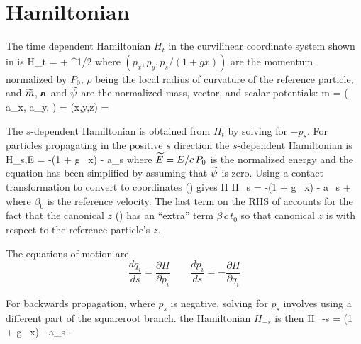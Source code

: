 \section{Hamiltonian}
\label{s:mag.hamiltonian}
The time dependent Hamiltonian $H_t$ in the curvilinear coordinate system shown
in  is
\Begineq
  H_t = \wt\psi + ^{1/2}
\Endeq
where $(p_x, p_y, p_s/(1+gx))$ are the momentum normalized by $P_0$,
$\rho$ being the local radius of curvature of the reference particle,
and $\widetilde m$, ${\bf a}$ and $\widetilde\psi$ are the normalized mass, vector, and scalar
potentials:
\Begineq
  \wt m =  \qquad
  \left( a_x, a_y,  \right) =  \qquad 
  \wt\psi(x,y,z) = 
\Endeq

The $s$-dependent Hamiltonian is obtained from $H_t$ by solving for
$-p_s$. For particles propagating in the positive $s$ direction the
$s$-dependent Hamiltonian is
\Begineq
  H_{s,E} = -(1 + g \, x)  - a_s
  \label{hse1gx1}
\Endeq
where $\widetilde E = E/c\, P_0$ is the normalized energy and the equation 
has been simplified by assuming that $\widetilde\psi$ is zero. Using a contact
transformation to convert to \bmad coordinates () gives
\Begineq
  H \equiv H_s = -(1 + g \, x)  - a_s +
   \, 
  \label{h1gx1}
\Endeq
where $\beta_0$ is the reference velocity. The last term on the RHS of
 accounts for the fact that the \bmad canonical $z$ ()
has an ``extra'' term $\beta \, c \, t_0$ so that \bmad canonical $z$ is with
respect to the reference particle's $z$.

The equations
of motion are
\begin{equation}
  \frac{dq_i}{ds} = \frac{\partial H}{\partial p_i} \qquad
  \frac{dp_i}{ds} = -\frac{\partial H}{\partial q_i}
  \label{rshp}
\end{equation}

For backwards propagation, where $p_s$ is negative, solving for $p_s$ involves using
a different part of the squareroot branch. the Hamiltonian $H_{-s}$ is then
\Begineq
  H_{-s} = (1 + g \, x)  - a_s - 
   \, 
\Endeq

